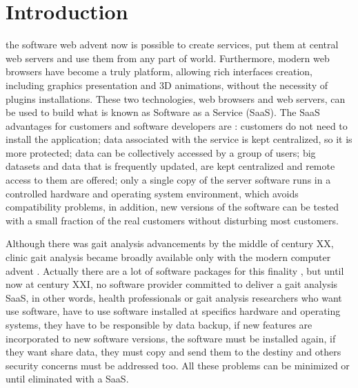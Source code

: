 \documentclass[journal]{IEEEtran}
\begin{document}
\section{Introduction}
% 
% 
% 
% 
 the software web advent now is possible to create services,
put them at central web servers and use them from any part of world.
Furthermore, modern web browsers have become a truly platform, allowing
rich interfaces creation, including graphics presentation and 3D animations, 
without the necessity of plugins installations.
These two technologies, web browsers and web servers, can be used to build
what is known as Software as a Service (SaaS). The SaaS advantages for 
customers and software developers are \cite{Fox2012}: customers do not need
to install the application; data associated with the service is kept centralized,
so it is more protected; data can be collectively accessed by a group of users;
big datasets and data that is frequently updated, are kept centralized 
and remote access to them are offered; only a single copy of the server software
runs in a controlled hardware and operating system environment, which avoids
compatibility problems, in addition, new versions of the software can be 
tested with a small fraction of the real customers without disturbing most
customers.

Although there was gait analysis advancements by the middle of century XX, 
clinic gait analysis became broadly available only
with the modern computer advent \cite{Baker2007}.
Actually there are a lot of software packages for this finality \cite{Moraes2003},
but until now at century XXI, no software provider committed to deliver a 
gait analysis SaaS, in other words, health professionals or gait analysis researchers
who want use software, have to use software installed at specifics hardware and
operating systems, they have to be responsible by data backup, if new features are
incorporated to new software versions, the software must be installed again, if they
want share data, they must copy and send them to the destiny and others
security concerns must be addressed too.
All these problems can be minimized or until eliminated with a SaaS.
\end{document}

